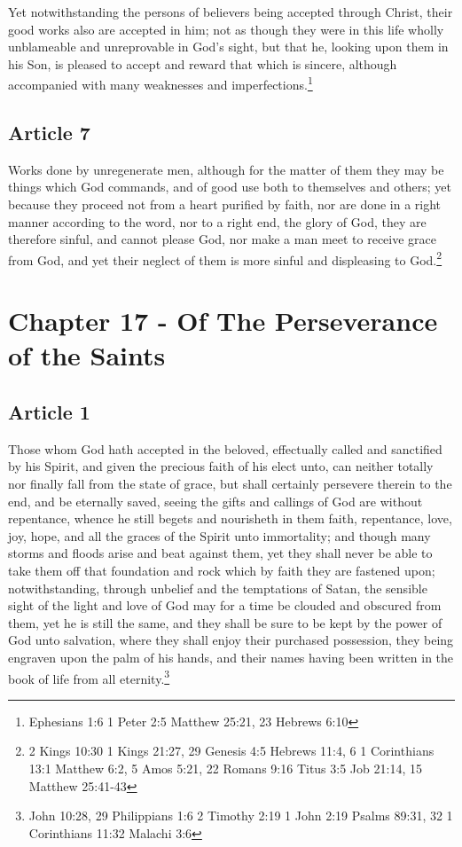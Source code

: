 \documentclass[12pt,letterpaper]{book}
\begin{document}
Yet notwithstanding the persons of believers being accepted through Christ, their good works also are accepted in him; not as though they were in this life wholly unblameable and unreprovable in God's sight, but that he, looking upon them in his Son, is pleased to accept and reward that which is sincere, although accompanied with many weaknesses and imperfections.\footnote{Ephesians 1:6 1 Peter 2:5 Matthew 25:21, 23 Hebrews 6:10}

\section{Article 7}

Works done by unregenerate men, although for the matter of them they may be things which God commands, and of good use both to themselves and others; yet because they proceed not from a heart purified by faith, nor are done in a right manner according to the word, nor to a right end, the glory of God, they are therefore sinful, and cannot please God, nor make a man meet to receive grace from God, and yet their neglect of them is more sinful and displeasing to God.\footnote{2 Kings 10:30 1 Kings 21:27, 29 Genesis 4:5 Hebrews 11:4, 6 1 Corinthians 13:1 Matthew 6:2, 5 Amos 5:21, 22 Romans 9:16 Titus 3:5 Job 21:14, 15 Matthew 25:41-43}

\chapter{Chapter 17 - Of The Perseverance of the Saints}
\section{Article 1}

Those whom God hath accepted in the beloved, effectually called and sanctified by his Spirit, and given the precious faith of his elect unto, can neither totally nor finally fall from the state of grace, but shall certainly persevere therein to the end, and be eternally saved, seeing the gifts and callings of God are without repentance, whence he still begets and nourisheth in them faith, repentance, love, joy, hope, and all the graces of the Spirit unto immortality; and though many storms and floods arise and beat against them, yet they shall never be able to take them off that foundation and rock which by faith they are fastened upon; notwithstanding, through unbelief and the temptations of Satan, the sensible sight of the light and love of God may for a time be clouded and obscured from them, yet he is still the same, and they shall be sure to be kept by the power of God unto salvation, where they shall enjoy their purchased possession, they being engraven upon the palm of his hands, and their names having been written in the book of life from all eternity.\footnote{John 10:28, 29 Philippians 1:6 2 Timothy 2:19 1 John 2:19 Psalms 89:31, 32 1 Corinthians 11:32 Malachi 3:6}
\end{document}
